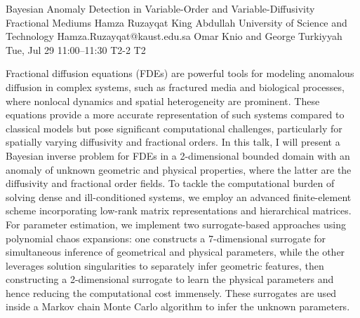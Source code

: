 \begin{talk}
  {Bayesian Anomaly Detection in Variable-Order and Variable-Diffusivity Fractional Mediums}%
  {Hamza Ruzayqat}%
  {King Abdullah University of Science and Technology}%
  {Hamza.Ruzayqat@kaust.edu.sa}%
  {Omar Knio and George Turkiyyah}%
  {}%
  {Tue, Jul 29 11:00--11:30}%
  {T2-2}%
  {T2}%
  
    
   
Fractional diffusion equations (FDEs) are powerful tools for modeling anomalous diffusion in complex systems, such as fractured media and biological processes, where nonlocal dynamics and spatial heterogeneity are prominent. These equations provide a more accurate representation of such systems compared to classical models but pose significant computational challenges, particularly for spatially varying diffusivity and fractional orders. In this talk, I will present a Bayesian inverse problem for FDEs in a 2-dimensional bounded domain with an anomaly of unknown geometric and physical properties, where the latter are the diffusivity and fractional order fields. To tackle the computational burden of solving dense and ill-conditioned systems, we employ an advanced finite-element scheme incorporating low-rank matrix representations and hierarchical matrices. For parameter estimation, we implement two surrogate-based approaches using polynomial chaos expansions: one constructs a 7-dimensional surrogate for simultaneous inference of geometrical and physical parameters, while the other leverages solution singularities to separately infer geometric features, then constructing a 2-dimensional surrogate to learn the physical parameters and hence reducing the computational cost immensely. These surrogates are used inside a Markov chain Monte Carlo algorithm to infer the unknown parameters.

\medskip

\end{talk}


